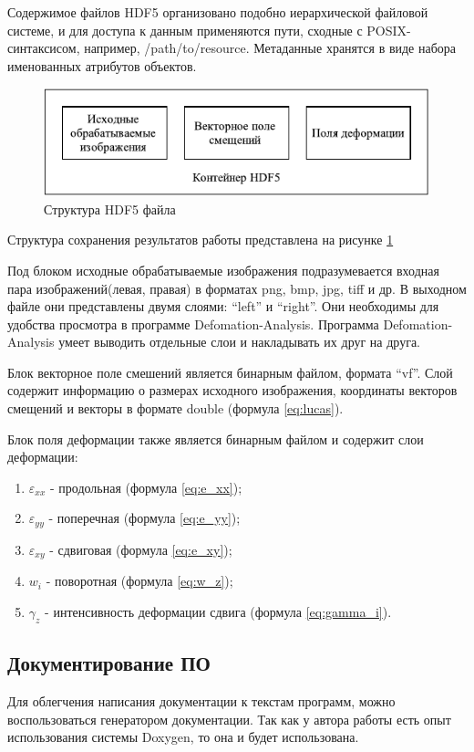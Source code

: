 Содержимое файлов HDF5 организовано подобно иерархической файловой системе, и для доступа к данным применяются пути, сходные с POSIX-синтаксисом, например, /path/to/resource. Метаданные хранятся в виде набора именованных атрибутов объектов.\cite{hdf5}
\begin{figure}
\centering
\includegraphics[width=0.7\linewidth]{images/structHDF5}
\caption{Структура HDF5 файла}
\label{fig:structHDF5}
\end{figure}

Структура сохранения результатов работы представлена на рисунке \ref{fig:structHDF5}

Под блоком исходные обрабатываемые изображения подразумевается входная пара изображений(левая, правая) в форматах png, bmp, jpg, tiff и др. В выходном файле они представлены двумя слоями: ``left'' и ``right''. Они необходимы для удобства просмотра в программе Defomation-Analysis. Программа Defomation-Analysis умеет выводить отдельные слои и накладывать их друг на друга.

Блок векторное поле смешений является бинарным файлом, формата ``vf''. Слой содержит информацию о размерах исходного изображения, координаты векторов смещений и векторы в формате double (формула \ref{eq:lucas}).

Блок поля деформации также является бинарным файлом и содержит слои деформации:
\begin{enumerate}
\item $\varepsilon_{xx}$ - продольная (формула \ref{eq:e_xx});
\item $\varepsilon_{yy}$ - поперечная (формула \ref{eq:e_yy});
\item $\varepsilon_{xy}$ - сдвиговая (формула \ref{eq:e_xy});
\item $w_{i}$ - поворотная (формула \ref{eq:w_z});
\item $\gamma_z$ - интенсивность деформации сдвига (формула \ref{eq:gamma_i}).
\end{enumerate}

\subsection{Документирование ПО}
Для облегчения написания документации к текстам программ, можно воспользоваться генератором документации. Так как у автора работы есть опыт использования системы Doxygen, то она и будет использована.

